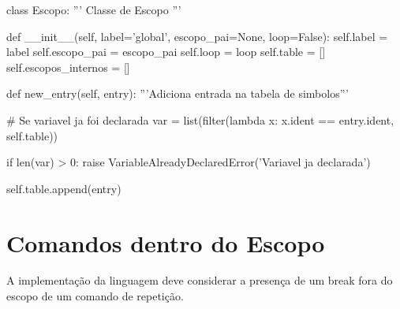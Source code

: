 \documentclass[
	12pt,				%
	openright,			%
	twoside,			%
	a4paper,			%
	english,			%
	french,				%
	spanish,			%
	brazil				%
	]{abntex2}
\begin{document}
\begin{python}
class Escopo:
    ''' Classe de Escopo '''

    def __init__(self, label='global', escopo_pai=None, loop=False):
        self.label = label
        self.escopo_pai = escopo_pai
        self.loop = loop
        self.table = []
        self.escopos_internos = []

    def new_entry(self, entry):
        '''Adiciona entrada na tabela de simbolos'''

        # Se variavel ja foi declarada
        var = list(filter(lambda x: x.ident == entry.ident, self.table))

        if len(var) > 0:
            raise VariableAlreadyDeclaredError('Variavel ja declarada')

        self.table.append(entry)
\end{python}

\section{Comandos dentro do Escopo}
A implementação da linguagem deve considerar a presença de um break fora
do escopo de um comando de repetição.
\end{document}
